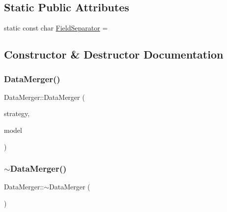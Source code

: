 \subsection*{Static Public Attributes}
\begin{DoxyCompactItemize}
\item 
static const char \mbox{\hyperlink{classdisplace_1_1workers_1_1_data_merger_a3cc15967d51577d68151d7a4afc8d6fc}{Field\+Separator}} = \textquotesingle{} \textquotesingle{}
\end{DoxyCompactItemize}


\subsection{Constructor \& Destructor Documentation}
\mbox{\label{classdisplace_1_1workers_1_1_data_merger_a7fba60bcda4bf09e0abed25bd541a828}} 
\subsubsection{\texorpdfstring{DataMerger()}{DataMerger()}}
{\footnotesize\ttfamily Data\+Merger\+::\+Data\+Merger (\begin{DoxyParamCaption}\item[{\mbox{\hyperlink{classdisplace_1_1workers_1_1_data_merger_1_1_strategy}{Strategy}} $\ast$}]{strategy,  }\item[{\mbox{\hyperlink{class_displace_model}{Displace\+Model}} $\ast$}]{model }\end{DoxyParamCaption})\hspace{0.3cm}{\ttfamily [explicit]}}

\mbox{\label{classdisplace_1_1workers_1_1_data_merger_aaf089ecdf095a33d201f29afc08f9aee}} 
\subsubsection{\texorpdfstring{$\sim$DataMerger()}{~DataMerger()}}
{\footnotesize\ttfamily Data\+Merger\+::$\sim$\+Data\+Merger (\begin{DoxyParamCaption}{ }\end{DoxyParamCaption})}



